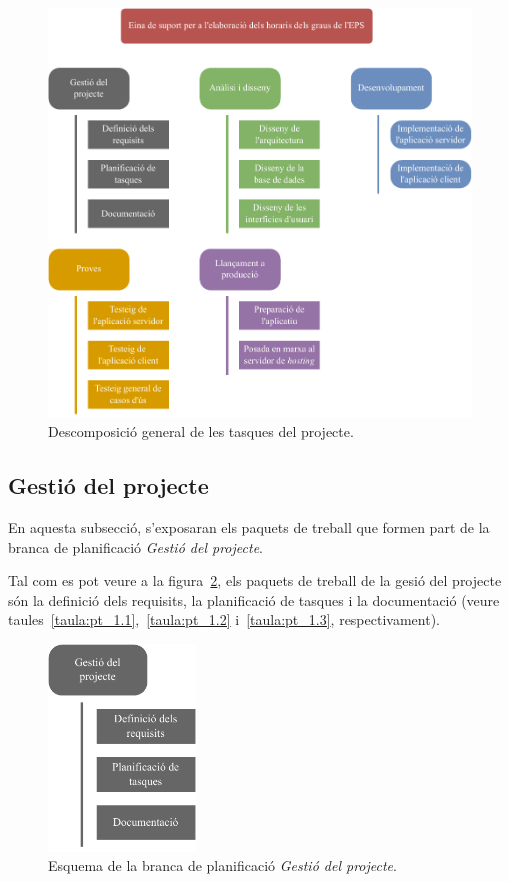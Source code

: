\documentclass[a4paper,12pt]{ThesisStyle}
\begin{document}
\begin{figure}[H]
	\centering
	\includegraphics[width=\textwidth]{assets/working_packages/general.pdf}
	\caption{\label{img:pt_general}Descomposició general de les tasques del projecte.}
\end{figure}

\newpage

\subsection{Gestió del projecte}
\label{subsec:gestio_projecte}

En aquesta subsecció, s'exposaran els paquets de treball que formen part de la branca de planificació \emph{Gestió del projecte}.

Tal com es pot veure a la figura~\ref{img:pt_gestio_projecte}, els paquets de treball de la gesió del projecte són la definició dels requisits, la planificació de tasques i la documentació (veure taules~\ref{taula:pt_1.1},~\ref{taula:pt_1.2} i~\ref{taula:pt_1.3}, respectivament).

\begin{figure}[H]
	\centering
	\includegraphics[width=0.35\textwidth]{assets/working_packages/gestioProjecte.pdf}
	\caption{\label{img:pt_gestio_projecte}Esquema de la branca de planificació \emph{Gestió del projecte}.}
\end{figure}
\end{document}
